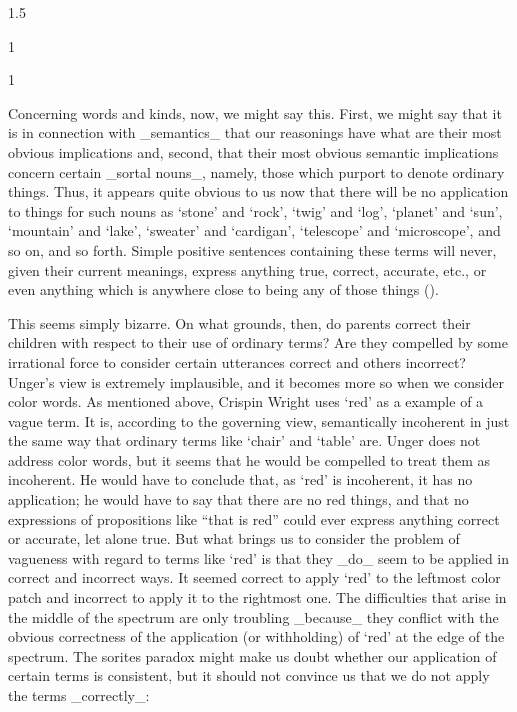 \documentclass[11pt]{article}
\newenvironment{squote}{%
\begin{spacing}{1}
       	\begin{list}{}{%
\setlength{\labelwidth}{0pt}%
\rightmargin\leftmargin%
}
\item\relax
}{%
\end{list}%
\end{spacing}
}
\begin{document}
\begin{spacing}{1.5}
\begin{squote}
\begin{squote}
Concerning words and kinds, now, we might say this.  First, we might
say that it is in connection with _semantics_ that our reasonings have
what are their most obvious implications and, second, that their most
obvious semantic implications concern certain _sortal nouns_, namely,
those which purport to denote ordinary things.  Thus, it appears quite
obvious to us now that there will be no application to things for such
nouns as `stone' and `rock', `twig' and `log', `planet' and `sun',
`mountain' and `lake', `sweater' and `cardigan', `telescope' and
`microscope', and so on, and so forth.  Simple positive sentences
containing these terms will never, given their current meanings,
express anything true, correct, accurate, etc., or even anything which
is anywhere close to being any of those things
(\citeyear[148]{unger1979}).

This seems simply bizarre.  On what grounds, then, do parents correct
their children with respect to their use of ordinary terms?  Are they
compelled by some irrational force to consider certain utterances
correct and others incorrect?  Unger's view is extremely implausible,
and it becomes more so when we consider color words.  As mentioned
above, Crispin Wright uses `red' as a example of a vague term.  It is,
according to the governing view, semantically incoherent in just the
same way that ordinary terms like `chair' and `table' are.  Unger does
not address color words, but it seems that he would be compelled to
treat them as incoherent.  He would have to conclude that, as `red' is
incoherent, it has no application; he would have to say that there are
no red things, and that no expressions of propositions like ``that is
red'' could ever express anything correct or accurate, let alone true.
But what brings us to consider the problem of vagueness with regard to
terms like `red' is that they _do_ seem to be applied in correct and
incorrect ways.  It seemed correct to apply `red' to the leftmost
color patch and incorrect to apply it to the rightmost one.  The
difficulties that arise in the middle of the spectrum are only
troubling _because_ they conflict with the obvious correctness of the
application (or withholding) of `red' at the edge of the spectrum.
The sorites paradox might make us doubt whether our application of
certain terms is consistent, but it should not convince us that we do
not apply the terms _correctly_:


\end{squote}
\end{squote}
\end{spacing}
\end{document}
